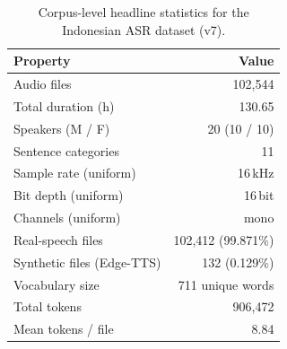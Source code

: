 \begin{table}[!t]
  \centering
  \caption{Corpus-level headline statistics for the Indonesian ASR
           dataset (v7).}
  \label{tab:corpus_overview}
  \small
  \begin{tabular}{lr}
  \toprule
  Property & Value \\
  \midrule
  Audio files                  & 102{,}544 \\
  Total duration (h)           & 130.65 \\
  Speakers (M / F)             & 20 (10 / 10) \\
  Sentence categories          & 11 \\
  Sample rate (uniform)        & 16\,kHz \\
  Bit depth (uniform)          & 16\,bit \\
  Channels (uniform)           & mono \\
  Real-speech files            & 102{,}412 (99.871\%) \\
  Synthetic files (Edge-TTS)   & 132 (0.129\%) \\
  Vocabulary size              & 711 unique words \\
  Total tokens                 & 906{,}472 \\
  Mean tokens / file           & 8.84 \\
  \bottomrule
  \end{tabular}
\end{table}
